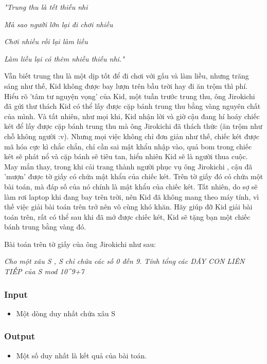 

\emph{"Trung thu là tết thiếu nhi}

\emph{Mà sao người lớn lại đi chơi nhiều}

\emph{Chơi nhiều rồi lại làm liều}

\emph{Làm liều lại có thêm nhiều thiếu nhi."}

Vẫn biết trung thu là một dịp tốt để đi chơi với gấu và làm liều, nhưng trăng sáng như thế, Kid không được bay lượn trên bầu trời hay đi ăn trộm thì phí. Hiểu rõ 'tâm tư nguyện vọng' của Kid, một tuần trước trung thu, ông Jirokichi đã gửi thư thách Kid có thể lấy được cặp bánh trung thu bằng vàng nguyên chất của mình. Và tất nhiên, như mọi khi, Kid nhận lời và giờ cậu đang hí hoáy chiếc két để lấy được cặp bánh trung thu mà ông Jirokichi đã thách thức (ăn trộm như chỗ không người :v). Nhưng mọi việc không chỉ đơn giản như thế, chiếc két được mã hóa cực kì chắc chắn, chỉ cần sai mật khẩu nhập vào, quả bom trong chiếc két sẽ phát nổ và cặp bánh sẽ tiêu tan, hiển nhiên Kid sẽ là người thua cuộc. May mắn thay, trong khi cải trang thành người phục vụ ông Jirokichi , cậu đã 'mượn' được tờ giấy có chứa mật khẩu của chiếc két. Trên tờ giấy đó có chứa một bài toán, mà đáp số của nó chính là mật khẩu của chiếc két. Tất nhiên, do sợ sẽ làm rơi laptop khi đang bay trên trời, nên Kid đã không mang theo máy tính, vì thế việc giải bài toán trên trở nên vô cùng khó khăn. Hãy giúp đỡ Kid giải bài toán trên, rất có thể sau khi đã mở được chiếc két, Kid sẽ tặng bạn một chiếc bánh trung bằng vàng đó.

Bài toán trên tờ giấy của ông Jirokichi như sau:

\emph{Cho một xâu S , S chỉ chứa các số 0 đến 9. Tính tổng các DÃY CON LIÊN TIẾP của S mod 10^9+7 }

\subsubsection{Input}
\begin{itemize}
	\item Một dòng duy nhất chứa xâu S
\end{itemize}

\subsubsection{Output}
\begin{itemize}
	\item Một số duy nhất là kết quả của bài toán.
\end{itemize}

